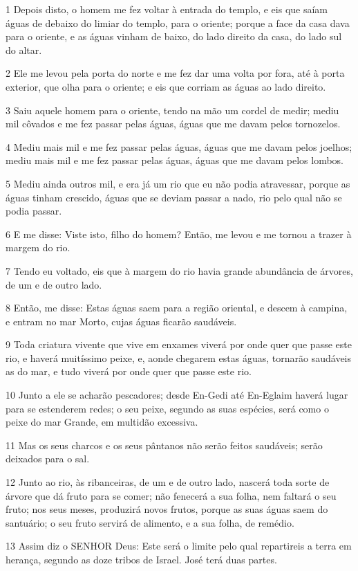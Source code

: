 \par 1 Depois disto, o homem me fez voltar à entrada do templo, e eis que saíam águas de debaixo do limiar do templo, para o oriente; porque a face da casa dava para o oriente, e as águas vinham de baixo, do lado direito da casa, do lado sul do altar.
\par 2 Ele me levou pela porta do norte e me fez dar uma volta por fora, até à porta exterior, que olha para o oriente; e eis que corriam as águas ao lado direito.
\par 3 Saiu aquele homem para o oriente, tendo na mão um cordel de medir; mediu mil côvados e me fez passar pelas águas, águas que me davam pelos tornozelos.
\par 4 Mediu mais mil e me fez passar pelas águas, águas que me davam pelos joelhos; mediu mais mil e me fez passar pelas águas, águas que me davam pelos lombos.
\par 5 Mediu ainda outros mil, e era já um rio que eu não podia atravessar, porque as águas tinham crescido, águas que se deviam passar a nado, rio pelo qual não se podia passar.
\par 6 E me disse: Viste isto, filho do homem? Então, me levou e me tornou a trazer à margem do rio.
\par 7 Tendo eu voltado, eis que à margem do rio havia grande abundância de árvores, de um e de outro lado.
\par 8 Então, me disse: Estas águas saem para a região oriental, e descem à campina, e entram no mar Morto, cujas águas ficarão saudáveis.
\par 9 Toda criatura vivente que vive em enxames viverá por onde quer que passe este rio, e haverá muitíssimo peixe, e, aonde chegarem estas águas, tornarão saudáveis as do mar, e tudo viverá por onde quer que passe este rio.
\par 10 Junto a ele se acharão pescadores; desde En-Gedi até En-Eglaim haverá lugar para se estenderem redes; o seu peixe, segundo as suas espécies, será como o peixe do mar Grande, em multidão excessiva.
\par 11 Mas os seus charcos e os seus pântanos não serão feitos saudáveis; serão deixados para o sal.
\par 12 Junto ao rio, às ribanceiras, de um e de outro lado, nascerá toda sorte de árvore que dá fruto para se comer; não fenecerá a sua folha, nem faltará o seu fruto; nos seus meses, produzirá novos frutos, porque as suas águas saem do santuário; o seu fruto servirá de alimento, e a sua folha, de remédio.
\par 13 Assim diz o SENHOR Deus: Este será o limite pelo qual repartireis a terra em herança, segundo as doze tribos de Israel. José terá duas partes.
